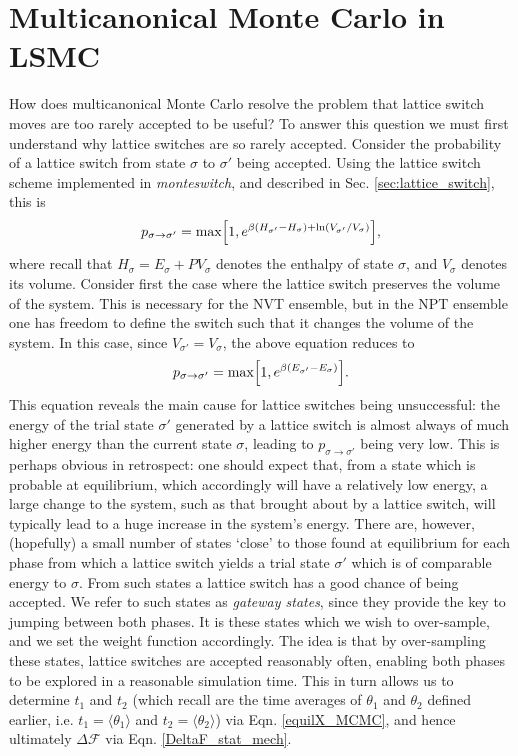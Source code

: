 \documentclass{report}
\begin{document}
\section{Multicanonical Monte Carlo in LSMC}
How does multicanonical Monte Carlo resolve the problem that lattice switch moves are too rarely accepted to be useful? To answer this question we must 
first understand why lattice switches are so rarely accepted. 
Consider the probability of a lattice switch from state $\sigma$ to $\sigma'$ being accepted. Using the lattice switch scheme implemented in
\emph{monteswitch}, and described in Sec. \ref{sec:lattice_switch}, this is
\begin{equation}\label{p_LSMC_NPT}
p_{\sigma\to\sigma'}=\text{max}\Bigl[1,e^{\beta(H_{\sigma'}-H_{\sigma})+\ln(V_{\sigma'}/V_{\sigma})}\Bigr],
\end{equation}
where recall that $H_{\sigma}=E_{\sigma}+PV_{\sigma}$ denotes the enthalpy of state $\sigma$, and $V_{\sigma}$ denotes its volume. Consider first the
case where the lattice switch preserves the volume of the system. This is necessary for the NVT ensemble, but in the NPT ensemble one has freedom to
define the switch such that it changes the volume of the system. In this case, since $V_{\sigma'}=V_{\sigma}$, the above equation reduces to
\begin{equation}\label{p_LSMC_NVT}
p_{\sigma\to\sigma'}=\text{max}\Bigl[1,e^{\beta(E_{\sigma'}-E_{\sigma})}\Bigr].
\end{equation}
This equation reveals the main cause for lattice switches being unsuccessful: the energy of the trial state $\sigma'$ generated by a 
lattice switch is almost always of much higher energy than the current state $\sigma$, leading to $p_{\sigma\to\sigma'}$ being very low. 
This is perhaps obvious in retrospect: one should expect that,
from a state which is probable at equilibrium, which accordingly will have a relatively low energy, a large change to the system, such as that 
brought about by a lattice switch, will typically lead to a huge increase in the system's energy. 
%
There are, however, (hopefully) a small number of states `close' to those found at equilibrium for each phase from which a lattice switch yields a 
trial state $\sigma'$ which is of comparable energy to $\sigma$. From such states a lattice switch has a good chance of being accepted.
We refer to such states as \emph{gateway states}, since they provide the key to jumping between both phases. It is these states which we wish to over-sample,
and we set the weight function accordingly. The idea is that by over-sampling these states, lattice switches are accepted reasonably often, 
enabling both phases to be explored in a reasonable simulation time. This in turn allows us to determine
$t_1$ and $t_2$ (which recall are the time averages of $\theta_1$ and $\theta_2$ defined earlier, i.e. $t_1=\langle\theta_1\rangle$ and 
$t_2=\langle\theta_2\rangle$) via Eqn. \eqref{equilX_MCMC}, and hence ultimately $\Delta \mathcal{F}$ via Eqn. \eqref{DeltaF_stat_mech}.
\end{document}
